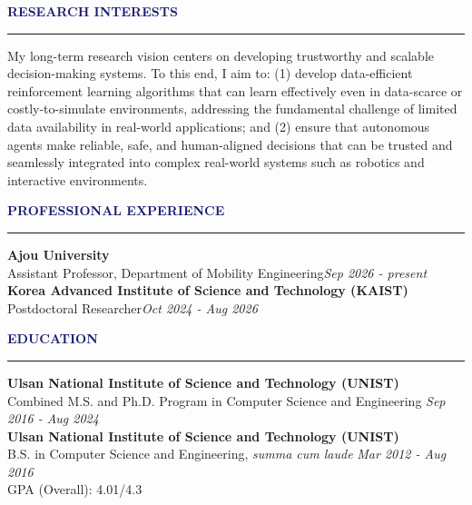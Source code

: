 \documentclass{resume} %
\renewenvironment{rSection}[1]{
\sectionskip
\textcolor{MidnightBlue}{\MakeUppercase{#1}}
\sectionlineskip
\hrule
\begin{list}{}{
\setlength{\leftmargin}{1.5em}
}
\item[]
}{
\end{list}
}
\begin{document}
\begin{rSection}{\bf Research Interests}
{My long-term research vision centers on developing trustworthy and scalable decision-making systems. To this end, I aim to:
(1) develop data-efficient reinforcement learning algorithms that can learn effectively even in data-scarce or costly-to-simulate environments, addressing the fundamental challenge of limited data availability in real-world applications; and
(2) ensure that autonomous agents make reliable, safe, and human-aligned decisions that can be trusted and seamlessly integrated into complex real-world systems such as robotics and interactive environments.}
\end{rSection}


\begin{rSection}{\bf Professional Experience}
{\bf Ajou University}
\\ Assistant Professor, Department of Mobility Engineering\hfill {\em Sep 2026 - present}
\vspace{0.1in}
\\ {\bf Korea Advanced Institute of Science and Technology (KAIST)}
\\ Postdoctoral Researcher\hfill {\em Oct 2024 - Aug 2026} 
\end{rSection}


\begin{rSection}{\bf Education}
{\bf Ulsan National Institute of Science and Technology (UNIST)}
\\ Combined M.S. and Ph.D. Program in Computer Science and Engineering \hfill {\em Sep 2016 - Aug 2024} 
\vspace{0.1in}
\\ {\bf Ulsan National Institute of Science and Technology (UNIST)} 
\\ B.S. in Computer Science and Engineering, \textit{summa cum laude} \hfill {\em Mar 2012 - Aug 2016} 
\\ GPA (Overall): 4.01/4.3 


\end{rSection}
\end{document}
